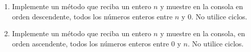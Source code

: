 \begin{enumerate}[label=\alph*)]
    \item Implemente un método que reciba un entero $n$ y muestre en la consola en orden descendente, todos los números enteros entre $n$ y 0. No utilice ciclos.
    \item Implemente un método que reciba un entero $n$ y muestre en la consola, en orden ascendente, todos los números enteros entre 0 y $n$. No utilice ciclos.
\end{enumerate}